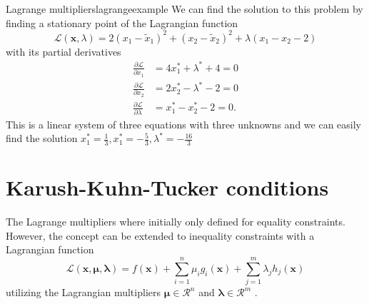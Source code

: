 \begin{example}{Lagrange multipliers}{lagrangeexample}
    We can find the solution to this problem by finding a stationary point of the Lagrangian function
    \begin{equation}
        \mathcal{\mathcal{L}}(\mathbf{x}, \lambda) = 2 (x_1-\tilde{x}_1)^2 + (x_2-\tilde{x}_2)^2 + \lambda (x_1 - x_2 -2)
    \end{equation}
    with its partial derivatives 
    \begin{align}
        \frac{\partial \mathcal{\mathcal{L}}}{\partial x_1} &= 4 x_1^* + \lambda^*  + 4 = 0\\
        \frac{\partial \mathcal{\mathcal{L}}}{\partial x_2} &= 2 x_2^* - \lambda^*  -2 = 0\\
        \frac{\partial \mathcal{\mathcal{L}}}{\partial \lambda} &= x_1^* - x_2^* -2 = 0.
    \end{align}
    This is a linear system of three equations with three unknowns and we can easily find the solution $x_1^*=\frac{1}{3} , x_1^*=-\frac{5}{3}, \lambda^*=-\frac{16}{3}$
\end{example}


\section{Karush-Kuhn-Tucker conditions}
The Lagrange multipliers where initially only defined for equality constraints. However, the concept can be extended to inequality constraints with a Lagrangian function 
\begin{equation}
    \mathcal{\mathcal{L}} (\mathbf{x}, \pmb{\mu}, \pmb{\lambda}) = f(\mathbf{x}) + \sum_{i=1}^n \mu_i g_i(\mathbf{x}) + \sum_{j=1}^m \lambda_j h_j(\mathbf{x}) 
\end{equation}
utilizing the Lagrangian multipliers $\pmb{\mu} \in \mathcal{R}^n$ and $\pmb{\lambda} \in \mathcal{R}^m$ \cite{Karush1939, Kuhn1951}.


